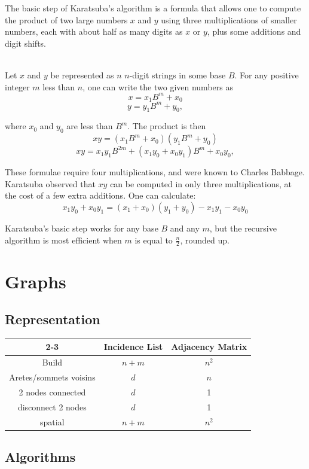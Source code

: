 \documentclass[a4paper, 12pt]{article}
\begin{document}
The basic step of Karatsuba's algorithm is a formula that allows one to compute the product of two large numbers $x$ and $y$ using three multiplications of smaller numbers, each with about half as many digits as $x$ or $y$, plus some additions and digit shifts.

~\\
Let $x$ and $y$ be represented as $n$ $n$-digit strings in some base $B$. For any positive integer $m$ less than $n$, one can write the two given numbers as
$$x = x_{1}B^{m}+x_{0}$$
$$y = y_{1}B^{m}+y_{0},$$

where $x_{0}$ and $y_{0}$ are less than $B^{m}$. The product is then
$$xy=(x_{1}B^{m}+x_{0})(y_{1}B^{m}+y_{0})$$
$$xy=x_{1}y_{1}B^{2m}+(x_{1}y_{0}+x_{0}y_{1})B^{m}+x_{0}y_{0},$$

These formulae require four multiplications, and were known to Charles Babbage. Karatsuba observed that $xy$ can be computed in only three multiplications, at the cost of a few extra additions. One can calculate:
$$x_{1}y_{0}+x_{0}y_{1}=(x_{1}+x_{0})(y_{1}+y_{0})-x_{1}y_{1}-x_{0}y_{0}$$

Karatsuba's basic step works for any base $B$ and any $m$, but the recursive algorithm is most efficient when $m$ is equal to $\frac{n}{2}$, rounded up.

\section{Graphs}

  \subsection{Representation}

\begin{center}
\begin{tabular}{| c | c | c |}
\cline{2-3}
\multicolumn{1}{c |}{} & Incidence List & Adjacency Matrix \\
\hline
Build & $n+m$ & $n^2$ \\
\hline
Aretes/sommets voisins & $d$ & $n$ \\
\hline
2 nodes connected & $d$ & 1 \\
\hline
disconnect 2 nodes & $d$ & 1 \\
\hline
spatial & $n+m$ & $n^2$ \\
\hline
\end{tabular}
\end{center}

  \subsection{Algorithms}
\end{document}
